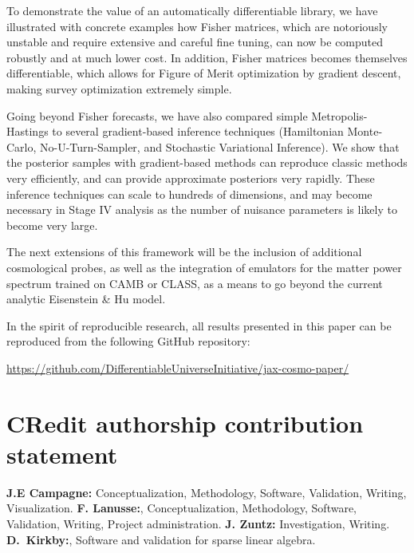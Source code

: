 \documentclass[twocolumn,twocolappendix,nofootinbib,iop]{openjournal}
\begin{document}
To demonstrate the value of an automatically differentiable library, we have illustrated with concrete examples how Fisher matrices, which are notoriously unstable and require extensive and careful fine tuning, can now be computed robustly and at much lower cost. In addition, Fisher matrices becomes themselves differentiable, which allows for  Figure of Merit optimization by gradient descent, making survey optimization extremely simple. 

Going beyond Fisher forecasts, we have also compared simple Metropolis-Hastings to several gradient-based inference techniques (Hamiltonian Monte-Carlo, No-U-Turn-Sampler, and Stochastic Variational Inference). We show that the posterior samples with gradient-based methods can reproduce classic methods very efficiently, and can provide approximate posteriors very rapidly. These inference techniques can scale to hundreds of dimensions, and may become necessary in Stage IV analysis as the number of nuisance parameters is likely to become very large.

The next extensions of this framework will be the inclusion of additional cosmological probes, as well as the integration of emulators for the matter power spectrum trained on CAMB or CLASS, as a means to go beyond the current analytic Eisenstein \& Hu model.

In the spirit of reproducible research, all results presented in this paper can be reproduced from the following GitHub repository:

\url{https://github.com/DifferentiableUniverseInitiative/jax-cosmo-paper/}



\section*{CRedit authorship contribution statement}
\textbf{J.E Campagne:} Conceptualization, Methodology, Software, Validation, Writing, Visualization.
\textbf{F. Lanusse:}, Conceptualization, Methodology, Software, Validation, Writing, Project administration.
\textbf{J. Zuntz:} Investigation, Writing.
\textbf{D.~Kirkby:}, Software and validation for sparse linear algebra.

\end{document}
